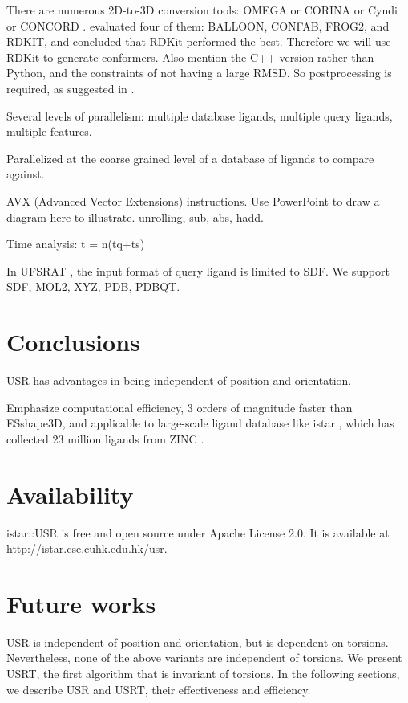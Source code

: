 There are numerous 2D-to-3D conversion tools: OMEGA \citep{462} or CORINA \citep{1392} or Cyndi \citep{1393,1394} or CONCORD \citep{}. \citep{1127} evaluated four of them: BALLOON, CONFAB, FROG2, and RDKIT, and concluded that RDKit performed the best. Therefore we will use RDKit to generate conformers. Also mention the C++ version rather than Python, and the constraints of not having a large RMSD. So postprocessing is required, as suggested in \citep{1127}.

Several levels of parallelism: multiple database ligands, multiple query ligands, multiple features.

Parallelized at the coarse grained level of a database of ligands to compare against.

AVX (Advanced Vector Extensions) instructions. Use PowerPoint to draw a diagram here to illustrate. unrolling, sub, abs, hadd.

Time analysis: t = n(tq+ts)

In UFSRAT \citep{1436}, the input format of query ligand is limited to SDF. We support SDF, MOL2, XYZ, PDB, PDBQT.

\section{Conclusions}

USR has advantages in being independent of position and orientation.

Emphasize computational efficiency, 3 orders of magnitude faster than ESshape3D, and applicable to large-scale ligand database like istar \citep{1362}, which has collected 23 million ligands from ZINC \citep{532,1178}.

\section{Availability}

istar::USR is free and open source under Apache License 2.0. It is available at http://istar.cse.cuhk.edu.hk/usr.

\section{Future works}

USR is independent of position and orientation, but is dependent on torsions. Nevertheless, none of the above variants are independent of torsions. We present USRT, the first algorithm that is invariant of torsions. In the following sections, we describe USR and USRT, their effectiveness and efficiency.

